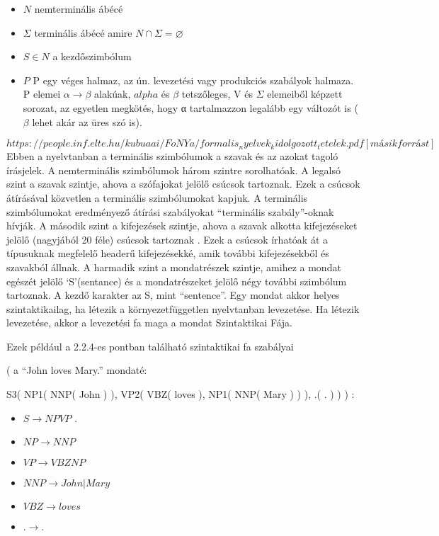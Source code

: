 \begin{itemize}
	\item \emph{$N$} nemterminális ábécé
	\item \emph{$\Sigma$} terminális ábécé amire $ N \cap \Sigma =\varnothing $
	\item \emph{$S\in N$} a kezdőszimbólum
	\item \emph{$P$} P egy véges halmaz, az ún. levezetési vagy produkciós szabályok halmaza. 
	P elemei $\alpha \to \beta$ alakúak, $alpha$ és $\beta$ tetszőleges, V és $\Sigma$ elemeiből képzett sorozat, az egyetlen megkötés, hogy α tartalmazzon legalább egy változót is ($\beta$ lehet akár az üres szó is).
\end{itemize}
$https://people.inf.elte.hu/kubuaai/FoNYa/formalis_nyelvek_kidolgozott_tetelek.pdf[ másik forrást]$
Ebben a nyelvtanban a terminális szimbólumok a szavak és az azokat tagoló írásjelek. A nemterminális szimbólumok három szintre sorolhatóak. A legalsó szint a szavak szintje, ahova a szófajokat jelölő csúcsok tartoznak. Ezek a csúcsok átírásával közvetlen a terminális szimbólumokat kapjuk. A terminális szimbólumokat eredményező átírási szabályokat “terminális szabály”-oknak hívják. A második szint a kifejezések szintje, ahova a szavak alkotta kifejezéseket jelölő (nagyjából 20 féle) csúcsok tartoznak . Ezek a csúcsok írhatóak át a típusuknak megfelelő headerű kifejezésekké, amik további kifejezésekből és szavakból állnak. A harmadik szint a mondatrészek szintje, amihez a mondat egészét jelölő ‘S’(sentance) és a mondatrészeket jelölő négy további szimbólum tartoznak.  A kezdő karakter az S, mint “sentence”. Egy mondat akkor helyes szintaktikailag, ha létezik a környezetfüggetlen nyelvtanban levezetése. Ha létezik levezetése, akkor a levezetési fa maga a mondat Szintaktikai Fája.

Ezek például a 2.2.4-es pontban található szintaktikai fa szabályai

( a “John loves Mary.” mondaté: 

S3( NP1( NNP( John ) ), VP2( VBZ( loves ),  NP1( NNP( Mary ) ) ), .( . ) ) ) :
\begin{itemize}
\item$S \to NP VP$ .
\item$NP \to NNP$
\item$VP \to VBZ NP$
\item$NNP \to John | Mary$
\item$VBZ \to loves$
\item$. \to .$
\end{itemize}

